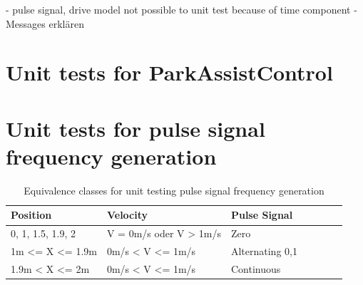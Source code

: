 - pulse signal, drive model not possible to unit test because of time component
- Messages erklären\\

\section{Unit tests for ParkAssistControl}

\section{Unit tests for pulse signal frequency generation}
\begin{table}[H]
\centering
\caption{Equivalence classes for unit testing pulse signal frequency generation}
\begin{adjustbox}{width=1\textwidth, center=\textwidth}
\renewcommand{\arraystretch}{1}
\begin{tabular}{lllllll}
\textbf{Position} & \textbf{Velocity} & \textbf{Pulse Signal} \\\hline
{0, 1, 1.5, 1.9, 2} & V = 0m/s oder V > 1m/s & Zero\\
1m <= X <= 1.9m  & 0m/s < V <= 1m/s & Alternating 0,1\\
1.9m < X <= 2m  & 0m/s < V <= 1m/s &Continuous
\end{tabular}
\end{adjustbox}
\end{table}

